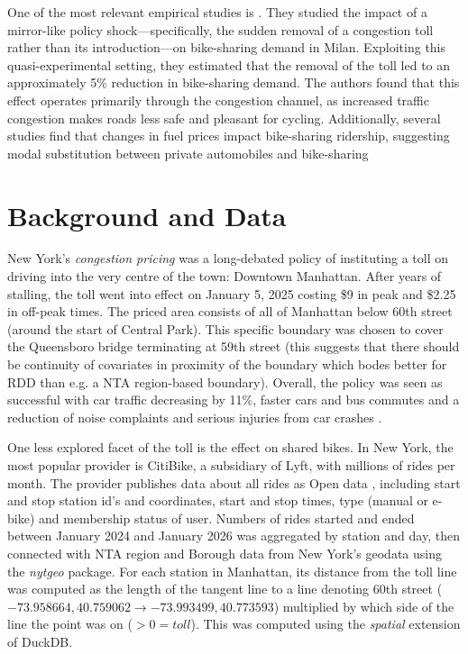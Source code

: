 \documentclass[10pt]{article}
\begin{document}
One of the most relevant empirical studies is \cite{CORNAGO2023102821}. They studied the impact of a mirror-like policy shock—specifically, the sudden removal of a congestion toll rather than its introduction—on bike-sharing demand in Milan. Exploiting this quasi-experimental setting, they estimated that the removal of the toll led to an approximately 5\% reduction in bike-sharing demand. The authors found that this effect operates primarily through the congestion channel, as increased traffic congestion makes roads less safe and pleasant for cycling. Additionally, several studies find that changes in fuel prices impact bike-sharing ridership, suggesting modal substitution between private automobiles and bike-sharing \parencite{He2020A,Berezvai2024Investigating}

\section{Background and Data}

New York's \emph{congestion pricing} was a long-debated policy of instituting a toll on driving into the very centre of the town: Downtown Manhattan. After years of stalling, the toll went into effect on January 5, 2025 costing \$9 in peak and \$2.25 in off-peak times. The priced area consists of all of Manhattan below 60th street (around the start of Central Park). This specific boundary was chosen to cover the Queensboro bridge terminating at 59th street (this suggests that there should be continuity of covariates in proximity of the boundary which bodes better for RDD than e.g. a NTA region-based boundary). Overall, the policy was seen as successful with car traffic decreasing by 11\%, faster cars and bus commutes and a reduction of noise complaints and serious injuries from car crashes \cite{NYT2026}.

One less explored facet of the toll is the effect on shared bikes. In New York, the most popular provider is CitiBike, a subsidiary of Lyft, with millions of rides per month. The provider publishes data about all rides as Open data \cite{CitiBike2026}, including start and stop station id's and coordinates, start and stop times, type (manual or e-bike) and membership status of user. Numbers of rides started and ended between January 2024 and January 2026 was aggregated by station and day, then connected with NTA region and Borough data from New York's geodata using the \emph{nytgeo} package. For each station in Manhattan, its distance from the toll line was computed as the length of the tangent line to a line denoting 60th street ($-73.958664, 40.759062 \to -73.993499, 40.773593$) multiplied by which side of the line the point was on ($>0 = toll$). This was computed using the \emph{spatial} extension of DuckDB. 
\end{document}
